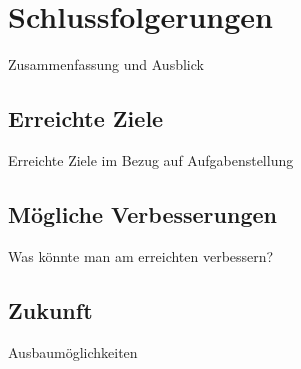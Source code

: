 \section{Schlussfolgerungen}
Zusammenfassung und Ausblick
\subsection{Erreichte Ziele}
Erreichte Ziele im Bezug auf Aufgabenstellung
\subsection{Mögliche Verbesserungen}
Was könnte man am erreichten verbessern?
\subsection{Zukunft}
Ausbaumöglichkeiten